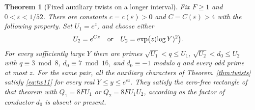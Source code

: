 \documentclass[a4paper,11pt]{article}
\newtheorem{theorem}[proposition]{Theorem}
\theoremstyle{definition}
\theoremstyle{remark}
\numberwithin{equation}{section}
\begin{document}
\begin{theorem}[Fixed auxiliary twists on a longer interval]
\label{thm:long232}
Fix \(F\ge1\) and \(0<\varepsilon<1/52\). There are constants
\(c=c(\varepsilon)>0\) and \(C=C(\varepsilon)>4\) with the
following property. Set \(U_1=e^z\), and choose either
\[
            U_2=e^{Cz}
       \quad\hbox{or}\quad U_2=\exp\!\big(z(\log Y)^2\big).
\]
For every sufficiently large \(Y\) there are primes
\(\sqrt{U_1}<q\le U_1\), \(\sqrt{U_2}<d_0\le U_2\) with
\(q\equiv3\bmod8\), \(d_0\equiv7\bmod16\), and
\(d_0\equiv-1\) modulo \(q\) and every odd prime at most \(z\).
For the same pair, all the auxiliary characters of
Theorem~\ref{thm:twists} satisfy \eqref{eq:tw11} for
\emph{every} real \(Y\le y\le e^{cz}\). They satisfy the
zero-free rectangle of that theorem with \(Q_1=8F U_1\) or
\(Q_2=8F U_1U_2\), according as the factor of conductor \(d_0\)
is absent or present.
\end{theorem}
\end{document}
